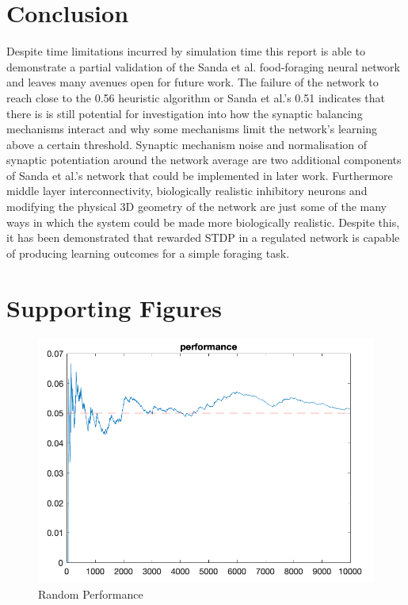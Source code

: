 \documentclass[11pt, twocolumn]{article}
\begin{document}
\section*{Conclusion}
Despite time limitations incurred by simulation time this report is able to demonstrate a partial validation of the Sanda et al. \cite{sanda2017multi} food-foraging neural network and leaves many avenues open for future work. The failure of the network to reach close to the 0.56 heuristic algorithm or Sanda et al.'s 0.51 indicates that there is is still potential for investigation into how the synaptic balancing mechanisms interact and why some mechanisms limit the network's learning above a certain threshold. Synaptic mechanism noise and normalisation of synaptic potentiation around the network average are two additional components of Sanda et al.'s network that could be implemented in later work. Furthermore middle layer interconnectivity, biologically realistic inhibitory neurons and modifying the physical 3D geometry of the network are just some of the many ways in which the system could be made more biologically realistic. Despite this, it has been demonstrated that rewarded \acs{STDP} in a regulated network is capable of producing learning outcomes for a simple foraging task.

\printacronyms[name=Acronyms]
\printbibliography{}

\section*{Supporting Figures}
\begin{figure}[H]
	\centering
	\includegraphics[width=\linewidth]{random_performance}
	\caption{Random Performance}
	\label{fig:random_movement}
\end{figure}
\end{document}
